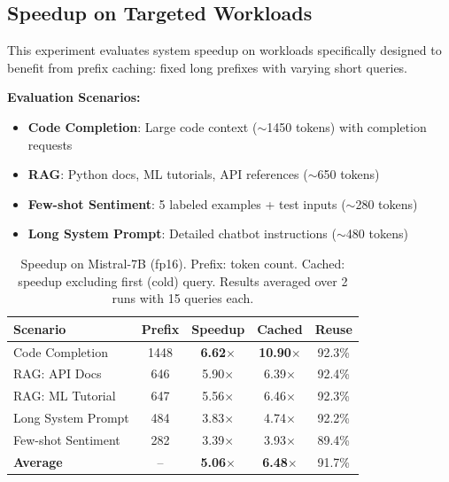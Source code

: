 \documentclass[10pt,conference]{IEEEtran}
\begin{document}
\subsection{Speedup on Targeted Workloads}

This experiment evaluates system speedup on workloads specifically designed to benefit from prefix caching: fixed long prefixes with varying short queries.

\textbf{Evaluation Scenarios:}
\begin{itemize}
\item \textbf{Code Completion}: Large code context ($\sim$1450 tokens) with completion requests
\item \textbf{RAG}: Python docs, ML tutorials, API references ($\sim$650 tokens)
\item \textbf{Few-shot Sentiment}: 5 labeled examples + test inputs ($\sim$280 tokens)
\item \textbf{Long System Prompt}: Detailed chatbot instructions ($\sim$480 tokens)
\end{itemize}

\begin{table}[t]
\centering
\caption{Speedup on Mistral-7B (fp16). Prefix: token count. Cached: speedup excluding first (cold) query. Results averaged over 2 runs with 15 queries each.}
\label{tab:targeted_mistral}
\begin{tabular}{lcccc}
\toprule
Scenario & Prefix & Speedup & Cached & Reuse \\
\midrule
Code Completion & 1448 & \textbf{6.62$\times$} & \textbf{10.90$\times$} & 92.3\% \\
RAG: API Docs & 646 & 5.90$\times$ & 6.39$\times$ & 92.4\% \\
RAG: ML Tutorial & 647 & 5.56$\times$ & 6.46$\times$ & 92.3\% \\
Long System Prompt & 484 & 3.83$\times$ & 4.74$\times$ & 92.2\% \\
Few-shot Sentiment & 282 & 3.39$\times$ & 3.93$\times$ & 89.4\% \\
\midrule
\textbf{Average} & -- & \textbf{5.06$\times$} & \textbf{6.48$\times$} & 91.7\% \\
\bottomrule
\end{tabular}
\end{table}
\end{document}
